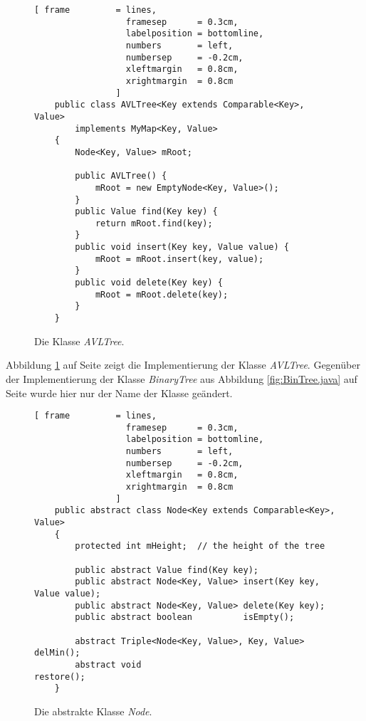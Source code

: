 \begin{figure}[!ht]
  \centering
\begin{Verbatim}[ frame         = lines, 
                  framesep      = 0.3cm, 
                  labelposition = bottomline,
                  numbers       = left,
                  numbersep     = -0.2cm,
                  xleftmargin   = 0.8cm,
                  xrightmargin  = 0.8cm
                ]
    public class AVLTree<Key extends Comparable<Key>, Value> 
        implements MyMap<Key, Value>
    {
        Node<Key, Value> mRoot; 
        
        public AVLTree() {
            mRoot = new EmptyNode<Key, Value>();
        }
        public Value find(Key key) {
            return mRoot.find(key);
        }
        public void insert(Key key, Value value) {
            mRoot = mRoot.insert(key, value);
        }
        public void delete(Key key) {
            mRoot = mRoot.delete(key);
        }
    }
    \end{Verbatim}
\vspace*{-0.3cm}
  \caption{Die Klasse \textsl{AVLTree}.}
  \label{fig:AVLTree.java}
\end{figure}

\noindent
Abbildung \ref{fig:AVLTree.java} auf Seite \pageref{fig:AVLTree.java} zeigt die Implementierung
der Klasse \textsl{AVLTree}.  Gegen\"uber der Implementierung der Klasse \textsl{BinaryTree}
aus Abbildung \ref{fig:BinTree.java} auf Seite \pageref{fig:BinTree.java} wurde hier nur der Name
der Klasse ge\"andert.

\begin{figure}[!ht]
  \centering
\begin{Verbatim}[ frame         = lines, 
                  framesep      = 0.3cm, 
                  labelposition = bottomline,
                  numbers       = left,
                  numbersep     = -0.2cm,
                  xleftmargin   = 0.8cm,
                  xrightmargin  = 0.8cm
                ]
    public abstract class Node<Key extends Comparable<Key>, Value>
    {
        protected int mHeight;  // the height of the tree
    
        public abstract Value find(Key key);
        public abstract Node<Key, Value> insert(Key key, Value value);
        public abstract Node<Key, Value> delete(Key key);
        public abstract boolean          isEmpty();
        
        abstract Triple<Node<Key, Value>, Key, Value> delMin();
        abstract void                                 restore();
    }
\end{Verbatim}
\vspace*{-0.3cm}
  \caption{Die abstrakte Klasse \textsl{Node}.}
  \label{fig:Node-AVL.java}
\end{figure}

